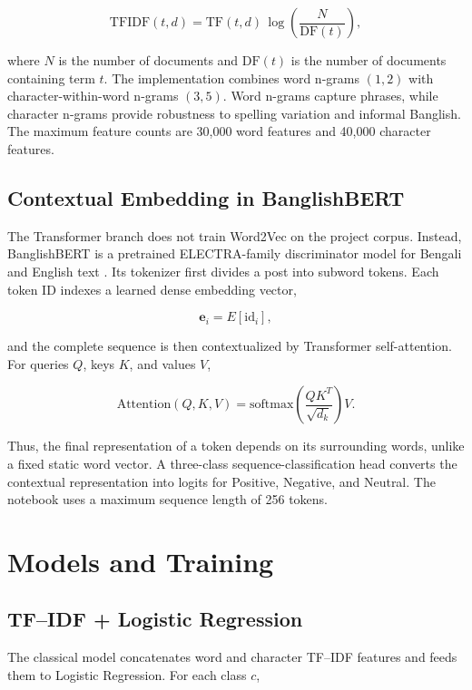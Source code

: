 \documentclass[12pt,a4paper]{report}
\begin{document}
\begin{equation}
\mathrm{TFIDF}(t,d)=\mathrm{TF}(t,d)\,
\log\left(\frac{N}{\mathrm{DF}(t)}\right),
\end{equation}

where $N$ is the number of documents and $\mathrm{DF}(t)$ is the number of
documents containing term $t$. The implementation combines word n-grams
$(1,2)$ with character-within-word n-grams $(3,5)$. Word n-grams capture
phrases, while character n-grams provide robustness to spelling variation
and informal Banglish. The maximum feature counts are 30,000 word features
and 40,000 character features.

\subsection{Contextual Embedding in BanglishBERT}
The Transformer branch does not train Word2Vec on the project corpus.
Instead, BanglishBERT is a pretrained ELECTRA-family discriminator model for
Bengali and English text \cite{banglabert,banglishbert,electra}. Its tokenizer
first divides a post into subword tokens. Each token ID indexes a learned
dense embedding vector,

\begin{equation}
\mathbf{e}_i=E[\mathrm{id}_i],
\end{equation}

and the complete sequence is then contextualized by Transformer
self-attention. For queries $Q$, keys $K$, and values $V$,

\begin{equation}
\mathrm{Attention}(Q,K,V)=
\mathrm{softmax}\left(\frac{QK^T}{\sqrt{d_k}}\right)V.
\end{equation}

Thus, the final representation of a token depends on its surrounding words,
unlike a fixed static word vector. A three-class sequence-classification head
converts the contextual representation into logits for Positive, Negative,
and Neutral. The notebook uses a maximum sequence length of 256 tokens.

\section{Models and Training}

\subsection{TF--IDF + Logistic Regression}
The classical model concatenates word and character TF--IDF features and
feeds them to Logistic Regression. For each class $c$,
\end{document}
